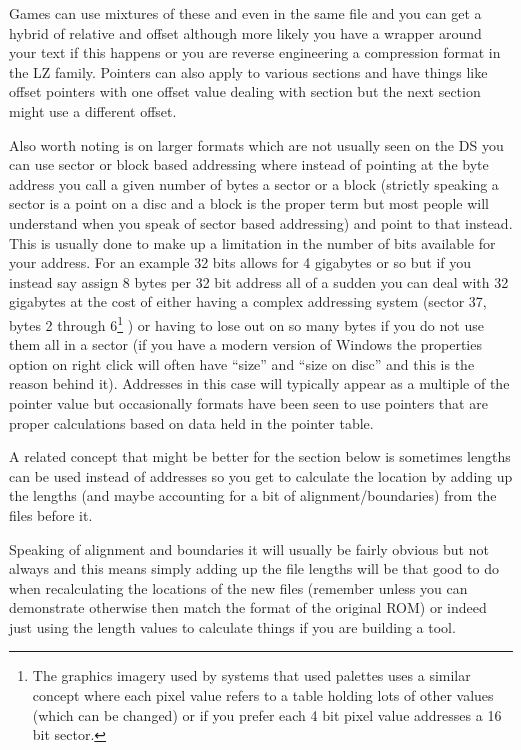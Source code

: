 \documentclass[
]{book}
\begin{document}
Games can use mixtures of these and even in the same file and you can get a hybrid of relative and offset although more likely you have a wrapper around your text if this happens or you are reverse engineering a compression format in the LZ family. Pointers can also apply to various sections and have things like offset pointers with one offset value dealing with section but the next section might use a different offset.

Also worth noting is on larger formats which are not usually seen on the DS you can use sector or block based addressing where instead of pointing at the byte address you call a given number of bytes a sector or a block (strictly speaking a sector is a point on a disc and a block is the proper term but most people will understand when you speak of sector based addressing) and point to that instead. This is usually done to make up a limitation in the number of bits available for your address. For an example 32 bits allows for 4 gigabytes or so but if you instead say assign 8 bytes per 32 bit address all of a sudden you can deal with 32 gigabytes at the cost of either having a complex addressing system (sector 37, bytes 2 through 6\footnote{The graphics imagery used by systems that used palettes uses a similar concept where each pixel value refers to a table holding lots of other values (which can be changed) or if you prefer each 4 bit pixel value addresses a 16 bit sector.} ) or having to lose out on so many bytes if you do not use them all in a sector (if you have a modern version of Windows the properties option on right click will often have ``size'' and ``size on disc'' and this is the reason behind it). Addresses in this case will typically appear as a multiple of the pointer value but occasionally formats have been seen to use pointers that are proper calculations based on data held in the pointer table.

A related concept that might be better for the section below is sometimes lengths can be used instead of addresses so you get to calculate the location by adding up the lengths (and maybe accounting for a bit of alignment/boundaries) from the files before it.

Speaking of alignment and boundaries it will usually be fairly obvious but not always and this means simply adding up the file lengths will be that good to do when recalculating the locations of the new files (remember unless you can demonstrate otherwise then match the format of the original ROM) or indeed just using the length values to calculate things if you are building a tool.
\end{document}
